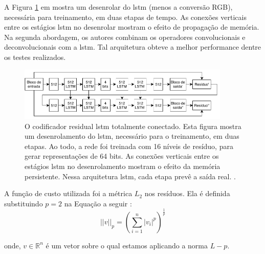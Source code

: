 A Figura \ref{fig:toderici_ae_lstm} em mostra um desenrolar do \acrshort{lstm} (menos a conversão RGB), necessária para treinamento, em duas etapas de tempo. As conexões verticais entre os estágios \acrshort{lstm} no desenrolar mostram o efeito de propagação de memória. 
Na segunda abordagem, os autores combinam os operadores convolucionais e deconvolucionais com a \acrshort{lstm}. Tal arquitetura obteve a melhor performance dentre os testes realizados. %


\begin{figure}[h]
	\centering
	\includegraphics[width=0.90\textwidth]{figuras/ae_lstm.pdf}
	\caption{O codificador residual \acrshort{lstm} totalmente conectado.  Esta figura mostra um desenrolamento do \acrshort{lstm}, necessário para o treinamento, em duas etapas.  Ao todo, a rede foi treinada com 16 níveis de resíduo, para gerar representações de 64 bits. As conexões verticais entre os estágios \acrshort{lstm} no desenrolamento mostram o efeito da memória persistente. Nessa arquitetura \acrshort{lstm}, cada etapa prevê a saída real. \cite{Variable2016Toderici}.}
	\label{fig:toderici_ae_lstm}
\end{figure}


A função de custo utilizada foi a métrica $L_2$ nos resíduos. Ela é definida substituindo $p=2$ na Equação a seguir \cite{nie2010efficient}:
\begin{equation}
||v||_p = \left ( \sum_{i=1}^n |v_i|^p \right)^{\frac{1}{p}}  
\end{equation}

onde, $v \in \mathbb{R}^n$ é um vetor sobre o qual estamos aplicando a norma $L-p$. 



